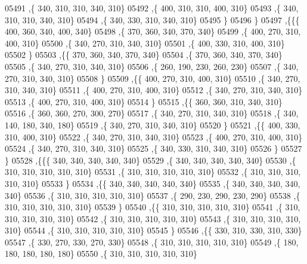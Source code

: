 \begin{DoxyCode}
05491     ,\{   340,   310,   310,   340,   310\}
05492     ,\{   400,   310,   310,   400,   310\}
05493     ,\{   340,   310,   310,   340,   310\}
05494     ,\{   340,   330,   310,   340,   310\}
05495     \}
05496    \}
05497   ,\{\{\{   400,   360,   340,   400,   340\}
05498     ,\{   370,   360,   340,   370,   340\}
05499     ,\{   400,   270,   310,   400,   310\}
05500     ,\{   340,   270,   310,   340,   310\}
05501     ,\{   400,   330,   310,   400,   310\}
05502     \}
05503    ,\{\{   370,   360,   340,   370,   340\}
05504     ,\{   370,   360,   340,   370,   340\}
05505     ,\{   340,   270,   310,   340,   310\}
05506     ,\{   260,   190,   230,   260,   230\}
05507     ,\{   340,   270,   310,   340,   310\}
05508     \}
05509    ,\{\{   400,   270,   310,   400,   310\}
05510     ,\{   340,   270,   310,   340,   310\}
05511     ,\{   400,   270,   310,   400,   310\}
05512     ,\{   340,   270,   310,   340,   310\}
05513     ,\{   400,   270,   310,   400,   310\}
05514     \}
05515    ,\{\{   360,   360,   310,   340,   310\}
05516     ,\{   360,   360,   270,   300,   270\}
05517     ,\{   340,   270,   310,   340,   310\}
05518     ,\{   340,   140,   180,   340,   180\}
05519     ,\{   340,   270,   310,   340,   310\}
05520     \}
05521    ,\{\{   400,   330,   310,   400,   310\}
05522     ,\{   340,   270,   310,   340,   310\}
05523     ,\{   400,   270,   310,   400,   310\}
05524     ,\{   340,   270,   310,   340,   310\}
05525     ,\{   340,   330,   310,   340,   310\}
05526     \}
05527    \}
05528   ,\{\{\{   340,   340,   340,   340,   340\}
05529     ,\{   340,   340,   340,   340,   340\}
05530     ,\{   310,   310,   310,   310,   310\}
05531     ,\{   310,   310,   310,   310,   310\}
05532     ,\{   310,   310,   310,   310,   310\}
05533     \}
05534    ,\{\{   340,   340,   340,   340,   340\}
05535     ,\{   340,   340,   340,   340,   340\}
05536     ,\{   310,   310,   310,   310,   310\}
05537     ,\{   290,   230,   290,   230,   290\}
05538     ,\{   310,   310,   310,   310,   310\}
05539     \}
05540    ,\{\{   310,   310,   310,   310,   310\}
05541     ,\{   310,   310,   310,   310,   310\}
05542     ,\{   310,   310,   310,   310,   310\}
05543     ,\{   310,   310,   310,   310,   310\}
05544     ,\{   310,   310,   310,   310,   310\}
05545     \}
05546    ,\{\{   330,   310,   330,   310,   330\}
05547     ,\{   330,   270,   330,   270,   330\}
05548     ,\{   310,   310,   310,   310,   310\}
05549     ,\{   180,   180,   180,   180,   180\}
05550     ,\{   310,   310,   310,   310,   310\}

\end{DoxyCode}
